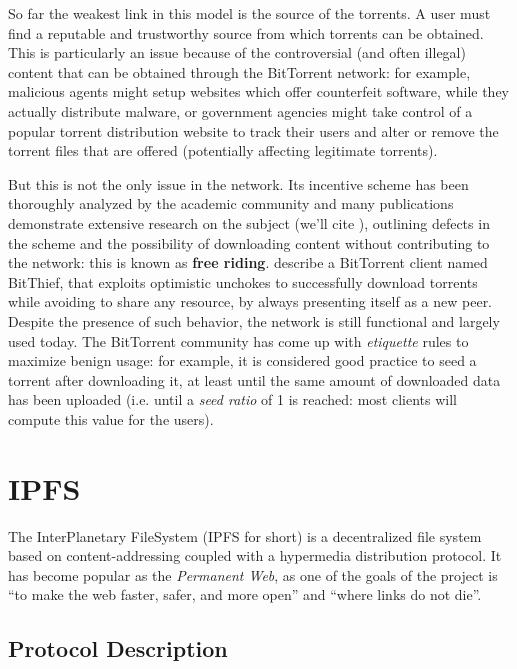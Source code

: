 \documentclass[mscthesis]{usiinfthesis}
\begin{document}
So far the weakest link in this model is the source of the torrents. A user must find a reputable and trustworthy source from which torrents can be obtained. This is particularly an issue because of the controversial (and often illegal) content that can be obtained through the BitTorrent network: for example, malicious agents might setup websites which offer counterfeit software, while they actually distribute malware, or government agencies might take control of a popular torrent distribution website to track their users and alter or remove the torrent files that are offered (potentially affecting legitimate torrents).

But this is not the only issue in the network. Its incentive scheme has been thoroughly analyzed by the academic community and many publications demonstrate extensive research on the subject (we'll cite \cite{Zghaibeh2008}), outlining defects in the scheme and the possibility of downloading content without contributing to the network: this is known as \textbf{free riding}. \cite{locher2006free} describe a BitTorrent client named BitThief, that exploits optimistic unchokes to successfully download torrents while avoiding to share any resource, by always presenting itself as a new peer. Despite the presence of such behavior, the network is still functional and largely used today. The BitTorrent community has come up with \textit{etiquette} rules to maximize benign usage: for example, it is considered good practice to seed a torrent after downloading it, at least until the same amount of downloaded data has been uploaded (i.e. until a \textit{seed ratio} of 1 is reached: most clients will compute this value for the users).


\section{IPFS}\label{proj:ipfs}

The InterPlanetary FileSystem (IPFS for short) is a decentralized file system based on content-addressing coupled with a hypermedia distribution protocol. It has become popular as the \textit{Permanent Web}, as one of the goals of the project is ``to make the web faster, safer, and more open'' and ``where links do not die''.

\subsection{Protocol Description}
\end{document}
